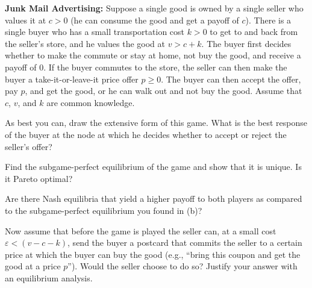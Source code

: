 
\textbf{Junk Mail Advertising:} Suppose a single good is owned by a single seller who
values it at $c > 0$ (he can consume the good and get a payoff of $c$). There is a single buyer who
has a small transportation cost $k > 0$ to get to and back from the seller's store, and he values
the good at $v > c + k$. The buyer first decides whether to make the commute or stay at home, not
buy the good, and receive a payoff of 0. If the buyer commutes to the store, the seller can then make
the buyer a take-it-or-leave-it price offer $p \ge 0$. The buyer can then accept the offer, pay $p$,
and get the good, or he can walk out and not buy the good. Assume that $c$, $v$, and $k$ are common
knowledge.
\begin{partes}
\item As best you can, draw the extensive form of this game. What is the best response of the buyer
at the node at which he decides whether to accept or reject the seller's offer?
\item Find the subgame-perfect equilibrium of the game and show that it is unique. Is it Pareto
optimal?
\item Are there Nash equilibria that yield a higher payoff to both players as compared to the
subgame-perfect equilibrium you found in (b)?
\item Now assume that before the game is played the seller can, at a small cost
$\varepsilon < (v - c - k)$, send the buyer a postcard that commits the seller to a certain price
at which the buyer can buy the good (e.g., ``bring this coupon and get the good at a price $p$'').
Would the seller choose to do so? Justify your answer with an equilibrium analysis.
\end{partes}
\resolespaco


